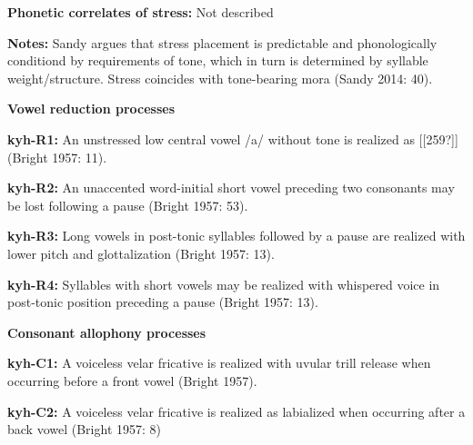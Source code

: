 \begin{styleBody}
\textbf{Phonetic correlates of stress: }Not described
\end{styleBody}

\begin{styleBody}
\textbf{Notes: }Sandy argues that stress placement is predictable and phonologically conditiond by requirements of tone, which in turn is determined by syllable weight/structure. Stress coincides with tone-bearing mora (Sandy 2014: 40).
\end{styleBody}

\begin{styleBody}
\textbf{Vowel reduction processes}
\end{styleBody}

\begin{styleBody}
\textbf{kyh-R1: }An unstressed low central vowel /a/ without tone is realized as [[259?]] (Bright 1957: 11).
\end{styleBody}

\begin{styleBody}
\textbf{kyh-R2:} An unaccented word-initial short vowel preceding two consonants may be lost following a pause (Bright 1957: 53).
\end{styleBody}

\begin{styleBody}
\textbf{kyh-R3:} Long vowels in post-tonic syllables followed by a pause are realized with lower pitch and glottalization (Bright 1957: 13).
\end{styleBody}

\begin{styleBody}
\textbf{kyh-R4:} Syllables with short vowels may be realized with whispered voice in post-tonic position preceding a pause (Bright 1957: 13).
\end{styleBody}

\begin{styleBody}
\textbf{Consonant allophony processes}
\end{styleBody}

\begin{styleBody}
\textbf{kyh-C1: }A voiceless velar fricative is realized with uvular trill release when occurring before a front vowel (Bright 1957).
\end{styleBody}

\begin{styleBody}
\textbf{kyh-C2: }A voiceless velar fricative is realized as labialized when occurring after a back vowel (Bright 1957: 8)
\end{styleBody}

